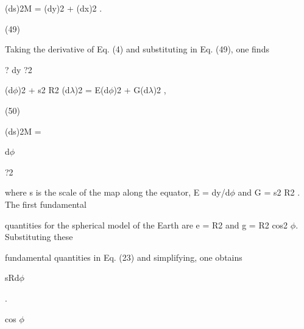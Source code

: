 \documentclass[a4paper,portrait,12pt]{article}
\begin{document}
\begin{flushleft}
(ds)2M = (dy)2 + (dx)2 .
\end{flushleft}





(49)





\begin{flushleft}
Taking the derivative of Eq. (4) and substituting in Eq. (49), one finds
\end{flushleft}


\begin{flushleft}
? dy ?2
\end{flushleft}


\begin{flushleft}
(d$\phi$)2 + s2 R2 (d$\lambda$)2 = E(d$\phi$)2 + G(d$\lambda$)2 ,
\end{flushleft}


(50)


\begin{flushleft}
(ds)2M =
\end{flushleft}


\begin{flushleft}
d$\phi$
\end{flushleft}


?2


\begin{flushleft}
where s is the scale of the map along the equator, E = dy/d$\phi$ and G = s2 R2 . The first fundamental
\end{flushleft}


\begin{flushleft}
quantities for the spherical model of the Earth are e = R2 and g = R2 cos2 $\phi$. Substituting these
\end{flushleft}


\begin{flushleft}
fundamental quantities in Eq. (23) and simplifying, one obtains
\end{flushleft}


\begin{flushleft}
sRd$\phi$
\end{flushleft}


.


\begin{flushleft}
cos $\phi$
\end{flushleft}
\end{document}
